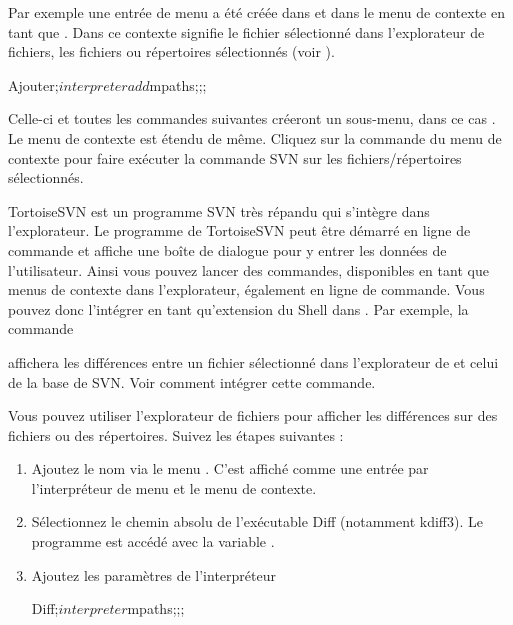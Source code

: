 Par exemple une entrée de menu a été créée dans  et dans le menu de contexte en tant que . Dans ce contexte  signifie le fichier sélectionné dans l'explorateur de fichiers,  les fichiers ou répertoires sélectionnés (voir ).

\begin{code}
 Ajouter;$interpreter add $mpaths;;;
\end{code}

Celle-ci et toutes les commandes suivantes créeront un sous-menu, dans ce cas . Le menu de contexte est étendu de même. Cliquez sur la commande du menu de contexte pour faire exécuter la commande SVN  sur les fichiers/répertoires sélectionnés.

TortoiseSVN est un programme SVN très répandu qui s'intègre dans l'explorateur. Le programme  de TortoiseSVN peut être démarré en ligne de commande et affiche une boîte de dialogue pour y entrer les données de l'utilisateur. Ainsi vous pouvez lancer des commandes, disponibles en tant que menus de contexte dans l'explorateur, également en ligne de commande. Vous pouvez donc l'intégrer en tant qu'extension du Shell dans  \codeblocks. Par exemple, la commande


affichera les différences entre un fichier sélectionné dans l'explorateur de \codeblocks et celui de la base de SVN. Voir  comment intégrer cette commande.



Vous pouvez utiliser l'explorateur de fichiers pour afficher les différences sur des fichiers ou des répertoires. Suivez les étapes suivantes :

\begin{enumerate}
\item Ajoutez le nom via le menu . C'est affiché comme une entrée par l'interpréteur de menu et le menu de contexte.
\item Sélectionnez le chemin absolu de l'exécutable Diff (notamment kdiff3). Le programme est accédé avec la variable .
\item Ajoutez les paramètres de l'interpréteur
\begin{cmd}
Diff;$interpreter $mpaths;;;
\end{cmd}
\end{enumerate}

